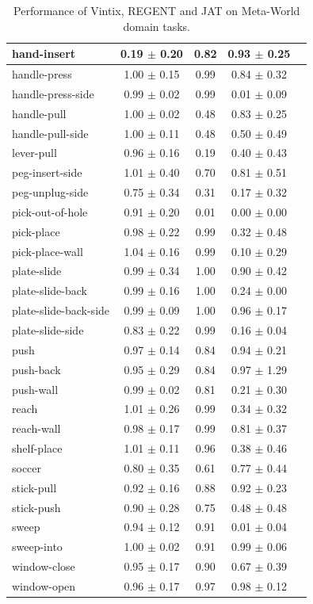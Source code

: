 \documentclass{article}
\theoremstyle{plain}
\theoremstyle{definition}
\theoremstyle{remark}
\begin{document}
\begin{table}[]
{\begin{tabular}{|l|c|c|c|c|}
hand-insert & 0.19 $\pm$ 0.20 & 0.82 & 0.93 $\pm$ 0.25 \\ \hline
handle-press & 1.00 $\pm$ 0.15 & 0.99 & 0.84 $\pm$ 0.32 \\ \hline
handle-press-side & 0.99 $\pm$ 0.02 & 0.99 & 0.01 $\pm$ 0.09 \\ \hline
handle-pull & 1.00 $\pm$ 0.02 & 0.48 & 0.83 $\pm$ 0.25 \\ \hline
handle-pull-side & 1.00 $\pm$ 0.11 & 0.48 & 0.50 $\pm$ 0.49 \\ \hline
lever-pull & 0.96 $\pm$ 0.16 & 0.19 & 0.40 $\pm$ 0.43 \\ \hline
peg-insert-side & 1.01 $\pm$ 0.40 & 0.70 & 0.81 $\pm$ 0.51 \\ \hline
peg-unplug-side & 0.75 $\pm$ 0.34 & 0.31 & 0.17 $\pm$ 0.32 \\ \hline
pick-out-of-hole & 0.91 $\pm$ 0.20 & 0.01 & 0.00 $\pm$ 0.00 \\ \hline
pick-place & 0.98 $\pm$ 0.22 & 0.99 & 0.32 $\pm$ 0.48 \\ \hline
pick-place-wall & 1.04 $\pm$ 0.16 & 0.99 & 0.10 $\pm$ 0.29 \\ \hline
plate-slide & 0.99 $\pm$ 0.34 & 1.00 & 0.90 $\pm$ 0.42 \\ \hline
plate-slide-back & 0.99 $\pm$ 0.16 & 1.00 & 0.24 $\pm$ 0.00 \\ \hline
plate-slide-back-side & 0.99 $\pm$ 0.09 & 1.00 & 0.96 $\pm$ 0.17 \\ \hline
plate-slide-side & 0.83 $\pm$ 0.22 & 0.99 & 0.16 $\pm$ 0.04 \\ \hline
push & 0.97 $\pm$ 0.14 & 0.84 & 0.94 $\pm$ 0.21 \\ \hline
push-back & 0.95 $\pm$ 0.29 & 0.84 & 0.97 $\pm$ 1.29 \\ \hline
push-wall & 0.99 $\pm$ 0.02 & 0.81 & 0.21 $\pm$ 0.30 \\ \hline
reach & 1.01 $\pm$ 0.26 & 0.99 & 0.34 $\pm$ 0.32 \\ \hline
reach-wall & 0.98 $\pm$ 0.17 & 0.99 & 0.81 $\pm$ 0.37 \\ \hline
shelf-place & 1.01 $\pm$ 0.11 & 0.96 & 0.38 $\pm$ 0.46 \\ \hline
soccer & 0.80 $\pm$ 0.35 & 0.61 & 0.77 $\pm$ 0.44 \\ \hline
stick-pull & 0.92 $\pm$ 0.16 & 0.88 & 0.92 $\pm$ 0.23 \\ \hline
stick-push & 0.90 $\pm$ 0.28 & 0.75 & 0.48 $\pm$ 0.48 \\ \hline
sweep & 0.94 $\pm$ 0.12 & 0.91 & 0.01 $\pm$ 0.04 \\ \hline
sweep-into & 1.00 $\pm$ 0.02 & 0.91 & 0.99 $\pm$ 0.06 \\ \hline
window-close & 0.95 $\pm$ 0.17 & 0.90 & 0.67 $\pm$ 0.39 \\ \hline
window-open & 0.96 $\pm$ 0.17 & 0.97 & 0.98 $\pm$ 0.12 \\ \hline
\end{tabular}}
\caption{Performance of Vintix, REGENT and JAT on Meta-World domain tasks.}
\end{table}
\end{document}
